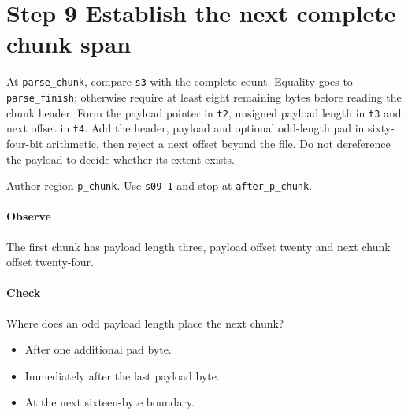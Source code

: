 \section{Step 9 Establish the next complete chunk span}\label{pcm-wav-s09}
At \texttt{parse\_chunk}, compare \texttt{s3} with the complete count. Equality goes to \texttt{parse\_finish}; otherwise require at least eight remaining bytes before reading the chunk header. Form the payload pointer in \texttt{t2}, unsigned payload length in \texttt{t3} and next offset in \texttt{t4}. Add the header, payload and optional odd-length pad in sixty-four-bit arithmetic, then reject a next offset beyond the file. Do not dereference the payload to decide whether its extent exists.

Author region \texttt{p\_chunk}. Use \texttt{s09-1} and stop at \texttt{after\_p\_chunk}.

\paragraph{Observe} The first chunk has payload length three, payload offset twenty and next chunk offset twenty-four.

\paragraph{Check} Where does an odd payload length place the next chunk?
\begin{itemize}
  \item[A.] After one additional pad byte.
  \item[B.] Immediately after the last payload byte.
  \item[C.] At the next sixteen-byte boundary.
\end{itemize}
